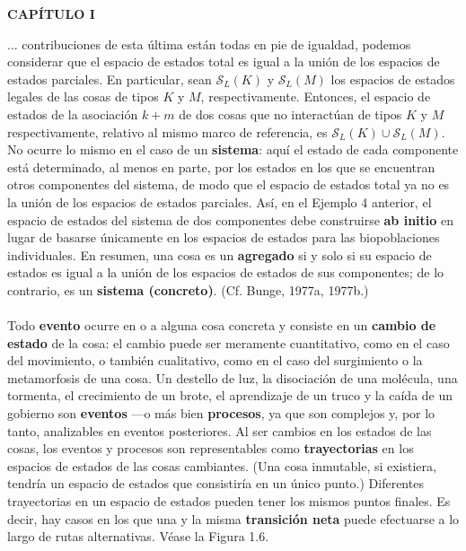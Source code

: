 \newpage
\fancyhf{}
\fancyhead[l]{\thepage}
\begin{center}
{\fontsize{16}{18}\selectfont \textbf{CAPÍTULO I}}
\end{center}
\vspace{0.5cm}

{\fontsize{13}{15}\selectfont
... contribuciones de esta última están todas en pie de igualdad, podemos considerar que el espacio de estados total es igual a la unión de los espacios de estados parciales. En particular, sean $\mathcal{S}_L(K)$ y $\mathcal{S}_L(M)$ los espacios de estados legales de las cosas de tipos $K$ y $M$, respectivamente. Entonces, el espacio de estados de la asociación $k+m$ de dos cosas que no interactúan de tipos $K$ y $M$ respectivamente, relativo al mismo marco de referencia, es $\mathcal{S}_L(K) \cup \mathcal{S}_L(M)$. No ocurre lo mismo en el caso de un \textbf{sistema}: aquí el estado de cada componente está determinado, al menos en parte, por los estados en los que se encuentran otros componentes del sistema, de modo que el espacio de estados total ya no es la unión de los espacios de estados parciales. Así, en el Ejemplo 4 anterior, el espacio de estados del sistema de dos componentes debe construirse \textbf{ab initio} en lugar de basarse únicamente en los espacios de estados para las biopoblaciones individuales. En resumen, una cosa es un \textbf{agregado} si y solo si su espacio de estados es igual a la unión de los espacios de estados de sus componentes; de lo contrario, es un \textbf{sistema (concreto)}. (Cf. Bunge, 1977a, 1977b.)
\\
\\Todo \textbf{evento} ocurre en o a alguna cosa concreta y consiste en un \textbf{cambio de estado} de la cosa: el cambio puede ser meramente cuantitativo, como en el caso del movimiento, o también cualitativo, como en el caso del surgimiento o la metamorfosis de una cosa. Un destello de luz, la disociación de una molécula, una tormenta, el crecimiento de un brote, el aprendizaje de un truco y la caída de un gobierno son \textbf{eventos} —o más bien \textbf{procesos}, ya que son complejos y, por lo tanto, analizables en eventos posteriores. Al ser cambios en los estados de las cosas, los eventos y procesos son representables como \textbf{trayectorias} en los espacios de estados de las cosas cambiantes. (Una cosa inmutable, si existiera, tendría un espacio de estados que consistiría en un único punto.) Diferentes trayectorias en un espacio de estados pueden tener los mismos puntos finales. Es decir, hay casos en los que una y la misma \textbf{transición neta} puede efectuarse a lo largo de rutas alternativas. Véase la Figura 1.6.
}
